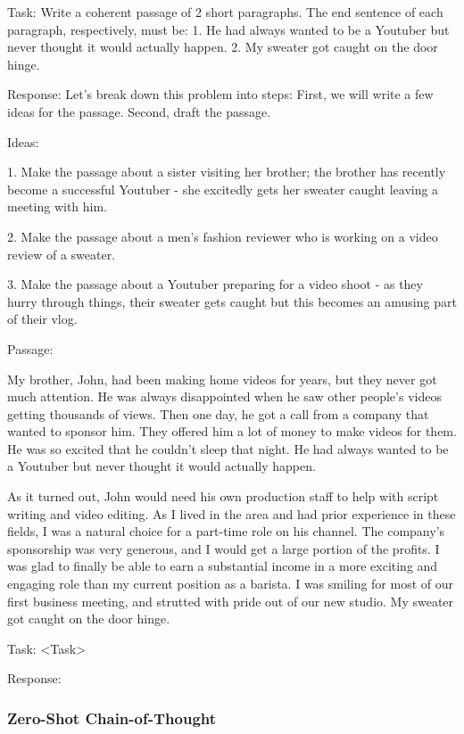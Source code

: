 \documentclass[11pt]{article}
\begin{document}
Task: Write a coherent passage of 2 short paragraphs. The end sentence of each paragraph, respectively, must be: 1. He had always wanted to be a Youtuber but never thought it would actually happen. 2. My sweater got caught on the door hinge.

Response: Let's break down this problem into steps: First, we will write a few ideas for the passage. Second, draft the passage.

Ideas:

1. Make the passage about a sister visiting her brother; the brother has recently become a successful Youtuber - she excitedly gets her sweater caught leaving a meeting with him.

2. Make the passage about a men's fashion reviewer who is working on a video review of a sweater.

3. Make the passage about a Youtuber preparing for a video shoot - as they hurry through things, their sweater gets caught but this becomes an amusing part of their vlog.

Passage:

My brother, John, had been making home videos for years, but they never got much attention. He was always disappointed when he saw other people's videos getting thousands of views. Then one day, he got a call from a company that wanted to sponsor him. They offered him a lot of money to make videos for them. He was so excited that he couldn't sleep that night. He had always wanted to be a Youtuber but never thought it would actually happen.

As it turned out, John would need his own production staff to help with script writing and video editing. As I lived in the area and had prior experience in these fields, I was a natural choice for a part-time role on his channel. The company's sponsorship was very generous, and I would get a large portion of the profits. I was glad to finally be able to earn a substantial income in a more exciting and engaging role than my current position as a barista. I was smiling for most of our first business meeting, and strutted with pride out of our new studio. My sweater got caught on the door hinge.

Task: <Task>

Response: 

\subsubsection*{Zero-Shot Chain-of-Thought}
\end{document}
